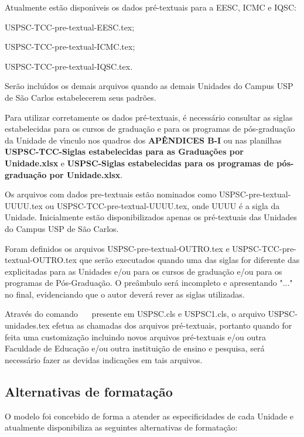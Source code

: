 Atualmente est\~ao dispon\'{\i}veis os dados pr\'e-textuais para a EESC, ICMC e IQSC:
			
			\begin{alineas}	 
				\item USPSC-TCC-pre-textual-EESC.tex;
				\item USPSC-TCC-pre-textual-ICMC.tex;
				\item USPSC-TCC-pre-textual-IQSC.tex.
			\end{alineas}
			
Ser\~ao inclu\'{\i}dos os demais arquivos quando as demais Unidades do Campus USP de S\~ao Carlos estabelecerem seus padr\~oes. 
			
Para utilizar corretamente os dados pr\'e-textuais, \'e necess\'ario consultar as siglas estabelecidas para os cursos de gradua\c{c}\~ao e para os programas de p\'os-gradua\c{c}\~ao da Unidade de v\'{\i}nculo nos quadros dos \textbf{AP\^ENDICES B-I} ou nas planilhas \textbf{USPSC-TCC-Siglas estabelecidas para as Gradua\c{c}\~oes por Unidade.xlsx} e \textbf{USPSC-Siglas estabelecidas para os programas de p\'os-gradua\c{c}\~ao por Unidade.xlsx}. 

Os arquivos com dados pre-textuais est\~ao nominados como USPSC-pre-textual-UUUU.tex ou USPSC-TCC-pre-textual-UUUU.tex, onde UUUU \'e a sigla da Unidade. Inicialmente est\~ao disponibilizados apenas os pr\'e-textuais das Unidades do Campus USP de S\~ao Carlos.
			
Foram definidos os arquivos USPSC-pre-textual-OUTRO.tex e USPSC-TCC-pre-textual-OUTRO.tex que ser\~ao executados quando uma das siglas for diferente das explicitadas para as Unidades e/ou para os cursos de gradua\c{c}\~ao e/ou para os programas de P\'os-Gradua\c{c}\~ao. O pre\^ambulo ser\'a incompleto e apresentando "..." no final, evidenciando que o autor dever\'a rever as siglas utilizadas.

Atrav\'es do comando \verb+  + presente em USPSC.cls e USPSC1.cls,  o arquivo USPSC-unidades.tex efetua as chamadas dos arquivos pr\'e-textuais, portanto quando for feita uma customiza\c{c}\~ao incluindo novos arquivos pr\'e-textuais e/ou outra Faculdade de Educa\c{c}\~ao e/ou outra institui\c{c}\~ao de ensino e pesquisa, ser\'a necess\'ario fazer as devidas indica\c{c}\~oes em tais arquivos. 
	 
\subsection{Alternativas de formata\c{c}\~ao}
O modelo foi concebido de forma a atender as especificidades de cada Unidade e atualmente disponibiliza as seguintes alternativas de formata\c{c}\~ao:
